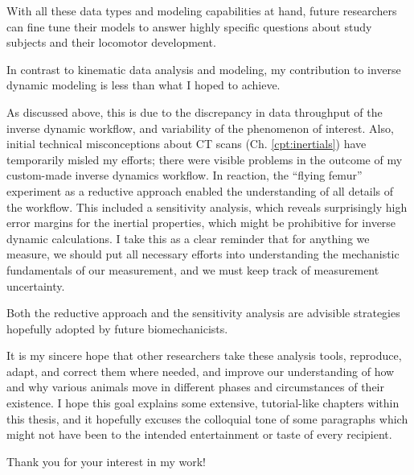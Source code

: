 With all these data types and modeling capabilities at hand, future researchers can fine tune their models to answer highly specific questions about study subjects and their locomotor development.


\bigskip
In contrast to kinematic data analysis and modeling, my contribution to inverse dynamic modeling is less than what I hoped to achieve.

As discussed above, this is due to the discrepancy in data throughput of the inverse dynamic workflow, and variability of the phenomenon of interest.
Also, initial technical misconceptions about CT scans (Ch. \ref{cpt:inertials}) have temporarily misled my efforts; there were visible problems in the outcome of my custom-made inverse dynamics workflow.
In reaction, the ``flying femur'' experiment as a reductive approach enabled the understanding of all details of the workflow.
This included a sensitivity analysis, which reveals surprisingly high error margins for the inertial properties, which might be prohibitive for inverse dynamic calculations.
I take this as a clear reminder that for anything we measure, we should put all necessary efforts into understanding the mechanistic fundamentals of our measurement, and we must keep track of measurement uncertainty.

Both the reductive approach and the sensitivity analysis are advisible strategies hopefully adopted by future biomechanicists.

\bigskip
It is my sincere hope that other researchers take these analysis tools, reproduce, adapt, and correct them where needed, and improve our understanding of how and why various animals move in different phases and circumstances of their existence.
I hope this goal explains some extensive, tutorial-like chapters within this thesis, and it hopefully excuses the colloquial tone of some paragraphs which might not have been to the intended entertainment or taste of every recipient.
\bigskip


Thank you for your interest in my work!
